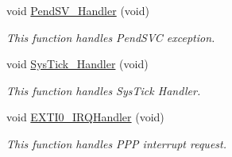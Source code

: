 \begin{DoxyCompactItemize}
void \hyperlink{group___d_a_c___signals_generation_ga6303e1f258cbdc1f970ce579cc015623}{Pend\-S\-V\-\_\-\-Handler} (void)
\begin{DoxyCompactList}\small\item\em This function handles Pend\-S\-V\-C exception. \end{DoxyCompactList}\item 
void \hyperlink{group___d_a_c___signals_generation_gab5e09814056d617c521549e542639b7e}{Sys\-Tick\-\_\-\-Handler} (void)
\begin{DoxyCompactList}\small\item\em This function handles Sys\-Tick Handler. \end{DoxyCompactList}\item 
void \hyperlink{group___d_a_c___signals_generation_ga17e9789a29a87d2df54f12b94dd1a0b6}{E\-X\-T\-I0\-\_\-\-I\-R\-Q\-Handler} (void)
\begin{DoxyCompactList}\small\item\em This function handles P\-P\-P interrupt request. \end{DoxyCompactList}\end{DoxyCompactItemize}
